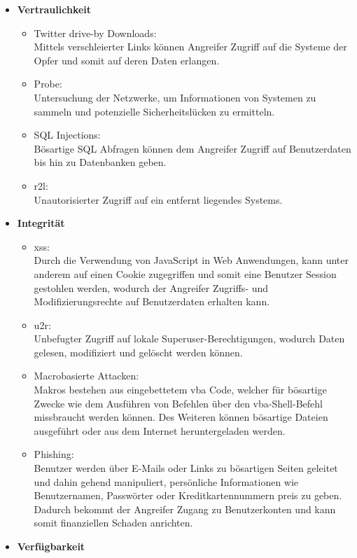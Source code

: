 \documentclass[
    12pt, %
    DIV10,
    ngerman, %
    a4paper, %
    oneside, %
    titlepage, %
    parskip=half, %
    headings=normal, %
    listof=totoc, %
    bibliography=totoc, %
    index=totoc, %
    captions=tableheading, %
    final %
]{scrreprt}
\begin{document}
\begin{itemize}
\item \textbf{Vertraulichkeit}
\begin{itemize}
\item Twitter drive-by Downloads:\\Mittels verschleierter Links können Angreifer Zugriff auf die Systeme der Opfer und somit auf deren Daten erlangen.
\item Probe:\\Untersuchung der Netzwerke, um Informationen von Systemen zu sammeln und potenzielle Sicherheitslücken zu ermitteln.
\item SQL Injections:\\Bösartige SQL Abfragen können dem Angreifer Zugriff auf Benutzerdaten bis hin zu Datenbanken geben.
\item \ac{r2l}:\\Unautorisierter Zugriff auf ein entfernt liegendes Systems.
\end{itemize}
\item \textbf{Integrität}
\begin{itemize}
\item \ac{xss}:\\Durch die Verwendung von JavaScript in Web Anwendungen, kann unter anderem auf einen Cookie zugegriffen und somit eine Benutzer Session gestohlen werden, wodurch der Angreifer Zugriffs- und Modifizierungsrechte auf Benutzerdaten erhalten kann. 
\item \ac{u2r}:\\Unbefugter Zugriff auf lokale Superuser-Berechtigungen, wodurch Daten gelesen, modifiziert und gelöscht werden können.
\item Macrobasierte Attacken:\\Makros bestehen aus eingebettetem \ac{vba} Code, welcher für bösartige Zwecke wie dem Ausführen von Befehlen über den \ac{vba}-Shell-Befehl missbraucht werden können. Des Weiteren können bösartige Dateien ausgeführt oder aus dem Internet heruntergeladen werden.
\item Phishing:\\Benutzer werden über E-Mails oder Links zu bösartigen Seiten geleitet und dahin gehend manipuliert, persönliche Informationen wie Benutzernamen, Passwörter oder Kreditkartennummern preis zu geben. Dadurch bekommt der Angreifer Zugang zu Benutzerkonten und kann somit finanziellen Schaden anrichten.
\end{itemize}
\item \textbf{Verfügbarkeit}

\end{itemize}
\end{document}

